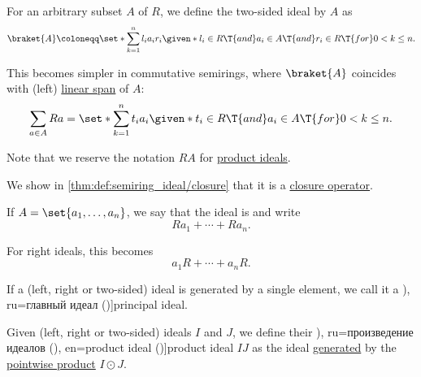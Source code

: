 \begin{definition}
\begin{thmenum}[resume=def:semiring_ideal]
     For an arbitrary subset \( A \) of \( R \), we define the two-sided ideal  by \( A \) as
    \begin{equation}\label{eq:def:semiring_ideal/generated}
      \braket{ A } \coloneqq \set*{ \sum_{k=1}^n l_i a_i r_i \given* l_i \in R \T{and} a_i \in A \T{and} r_i \in R \T{for} 0 < k \leq n }.
    \end{equation}

    This becomes simpler in commutative semirings, where \( \braket{ A } \) coincides with (left) \hyperref[def:semimodule/subobject]{linear span} of \( A \):
    \begin{equation*}
      \sum_{a \in A} R a = \set*{ \sum_{k=1}^n t_i a_i \given* t_i \in R \T{and} a_i \in A \T{for} 0 < k \leq n }.
    \end{equation*}

    Note that we reserve the notation \( RA \) for \hyperref[def:semiring_ideal/product]{product ideals}.

    We show in \cref{thm:def:semiring_ideal/closure} that it is a \hyperref[def:abstract_closure_operator]{closure operator}.

    If \( A = \set{ a_1, \ldots, a_n } \), we say that the ideal is  and write
    \begin{equation*}
      R a_1 + \cdots + R a_n.
    \end{equation*}

    For right ideals, this becomes
    \begin{equation*}
      a_1 R + \cdots + a_n R.
    \end{equation*}

     If a (left, right or two-sided) ideal is generated by a single element, we call it a \term[bg=главен идеал (\cite[def. V.8]{ГеновМиховскиМоллов1991Алгебра}), ru=главный идеал (\cite[392]{Винберг2014КурсАлгебры})]{principal ideal}.

    \mimprovised Given (left, right or two-sided) ideals \( I \) and \( J \), we define their \term[bg=произведение на идеали (\cite[3]{КоцевСидеров2016КомутативнаАлгебра}), ru=произведение идеалов (\cite[337]{Тыртышников2017ОсновыАлгебры}), en=product ideal (\cite[413]{Knapp2016BasicAlgebra})]{product ideal} \( IJ \) as the ideal \hyperref[def:semiring_ideal/generated]{generated} by the \hyperref[def:power_semigroup]{pointwise product} \( I \odot J \).


\end{thmenum}
\end{definition}

